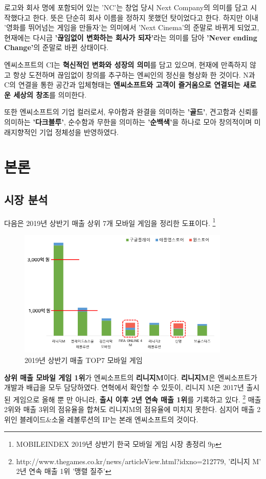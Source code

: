 \documentclass[11pt]{oblivoir}
\begin{document}
			로고와 회사 명에 포함되어 있는 'NC'는 창업 당시 Next Company의 의미를 담고 시작했다고 한다. 뜻은 단순히 회사 이름을 정하지 못했던 탓이었다고 한다. 하지만 이내 '영화를 뛰어넘는 게임을 만들자'는 의미에서 'Next Cinema'의 준말로 바뀌게 되었고, 현재에는 다시금 \textbf{'끊임없이 변화하는 회사가 되자'}라는 의미를 담아 \textbf{'Never ending Change'}의 준말로 바뀐 상태이다.
			
			엔씨소프트의 CI는 \textbf{혁신적인 변화와 성장의 의미}를 담고 있으며, 현재에 만족하지 않고 항상 도전하며 끊임없이 창의를 추구하는 엔씨인의 정신을 형상화 한 것이다. N과 C의 연결을 통한 공간과 입체형태는 \textbf{엔씨소프트와 고객이 즐거움으로 연결되는 새로운 세상의 창조}를 의미한다.
			
			또한 엔씨소프트의 기업 컬러로서, 우아함과 완결을 의미하는 \textbf{'골드'}, 견고함과 신뢰를 의미하는 \textbf{'다크블루'}, 순수함과 무한을 의미하는 \textbf{'순백색'}을 하나로 모아 창의적이며 미래지향적인 기업 정체성을 반영하였다.
			
	\section{본론}
		\subsection{시장 분석}
		\noindent
		다음은 2019년 상반기 매출 상위 7개 모바일 게임을 정리한 도표이다.  \footnote{MOBILEINDEX 2019년 상반기 한국 모바일 게임 시장 총정리 9p}
		\begin{figure}[htbp]
			\centering
			\includegraphics[width=0.9\textwidth]{Sangbangi.png}
			\caption{2019년 상반기 매출 TOP7 모바일 게임}
		\end{figure}
		
		\textbf{상위 매출 모바일 게임 1위}가 엔씨소프트의 \textbf{리니지M}이다. \textbf{리니지M}은 엔씨소프트가 개발과 배급을 모두 담당하였다. 연혁에서 확인할 수 있듯이, 리니지 M은 2017년 출시된 게임으로 올해 뿐 만 아니라, \textbf{출시 이후 2년 연속 매출 1위}를 기록하고 있다.
		\footnote{http://www.thegames.co.kr/news/articleView.html?idxno=212779, '리니지 M' 2년 연속 매출 1위 '맹렬 질주'}
		매출 2위와 매출 3위의 점유율을 합쳐도 리니지M의 점유율에 미치지 못한다. 심지어 매출 2위인 블레이드\&소울 레볼루션의 IP는 본래 엔씨소프트의 것이다.
		
\end{document}
